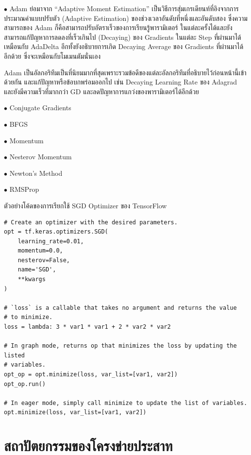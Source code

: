 \noindent $\bullet$ Adam ย่อมาจาก \enquote{Adaptive Moment Estimation} เป็นวิธีการสุ่มเกรเดียนท์ที่อิงจากการประมาณค่าแบบปรับตัว 
(Adaptive Estimation) ของช่วงเวลาอันดับที่หนึ่งและอันดับสอง ซึ่งความสามารถของ Adam ก็คือสามารถปรับอัตราเร็วของการเรียนรู้พารามิเตอร์%
ในแต่ละครั้งได้และยังสามารถแก้ปัญหาการลดลงที่เร็วเกินไป (Decaying) ของ Gradients ในแต่ละ Step ที่ผ่านมาได้เหมือนกับ AdaDelta 
อีกทั้งยังอธิบายการเกิด Decaying Average ของ Gradients ที่ผ่านมาได้อีกด้วย ซึ่งจะเหมือนกับโมเมนตัมนั่นเอง

Adam เป็นอัลกอริทึมเป็นที่นิยมมากที่สุดเพราะรวมข้อดีของแต่ละอัลกอริทึมที่อธิบายไว้ก่อนหน้านี้เข้าด้วยกัน และแก้ปัญหาหรือข้อบกพร่อมออกไป 
เช่น Decaying Learning Rate ของ Adagrad และยังมีความเร็วที่มากกว่า GD และลดปัญหาการแกว่งของพารามิเตอร์ได้อีกด้วย

\noindent $\bullet$ Conjugate Gradients

\noindent $\bullet$ BFGS

\noindent $\bullet$ Momentum

\noindent $\bullet$ Nesterov Momentum

\noindent $\bullet$ Newton's Method

\noindent $\bullet$ RMSProp


ตัวอย่างโค้ดของการเรียกใช้ SGD Optimizer ของ TensorFlow

\begin{lstlisting}[style=MyPython]
# Create an optimizer with the desired parameters.
opt = tf.keras.optimizers.SGD(
    learning_rate=0.01,
    momentum=0.0,
    nesterov=False,
    name='SGD',
    **kwargs
)

# `loss` is a callable that takes no argument and returns the value
# to minimize.
loss = lambda: 3 * var1 * var1 + 2 * var2 * var2

# In graph mode, returns op that minimizes the loss by updating the listed
# variables.
opt_op = opt.minimize(loss, var_list=[var1, var2])
opt_op.run()

# In eager mode, simply call minimize to update the list of variables.
opt.minimize(loss, var_list=[var1, var2])
\end{lstlisting}

\section{สถาปัตยกรรมของโครงข่ายประสาท}
\label{sec:arch_nn}


